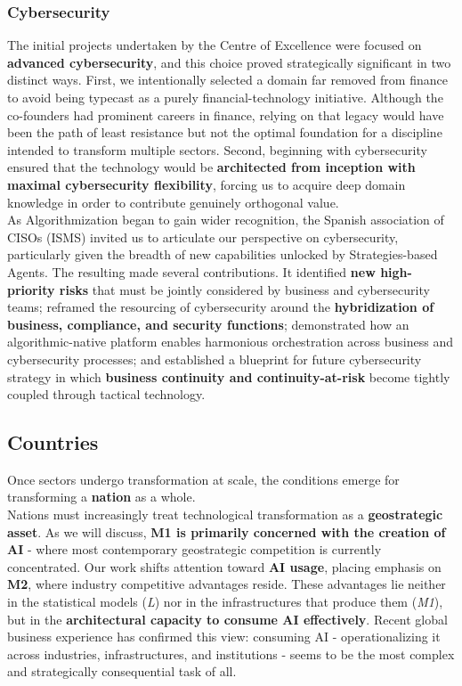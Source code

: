 \documentclass{article}
\begin{document}
\subsubsection{Cybersecurity}
\label{subsubsection: Cybersecurity}
The initial projects undertaken by the Centre of Excellence were focused on \textbf{advanced cybersecurity}, and this choice proved strategically significant in two distinct ways. First, we intentionally selected a domain far removed from finance to avoid being typecast as a purely financial-technology initiative. Although the co-founders had prominent careers in finance, relying on that legacy would have been the path of least resistance but not the optimal foundation for a discipline intended to transform multiple sectors. Second, beginning with cybersecurity ensured that the technology would be \textbf{architected from inception with maximal cybersecurity flexibility}, forcing us to acquire deep domain knowledge in order to contribute genuinely orthogonal value.\\

As Algorithmization began to gain wider recognition, the Spanish association of CISOs (ISMS) invited us to articulate our perspective on cybersecurity, particularly given the breadth of new capabilities unlocked by Strategies-based Agents. The resulting \cite{Modern Cybersecurity} made several contributions. It identified \textbf{new high-priority risks} that must be jointly considered by business and cybersecurity teams; reframed the resourcing of cybersecurity around the \textbf{hybridization of business, compliance, and security functions}; demonstrated how an algorithmic-native platform enables harmonious orchestration across business and cybersecurity processes; and established a blueprint for future cybersecurity strategy in which \textbf{business continuity and continuity-at-risk} become tightly coupled through tactical technology.\\


\subsection{Countries}
\label{subsection: Countries}
Once sectors undergo transformation at scale, the conditions emerge for transforming a \textbf{nation} as a whole.\\

Nations must increasingly treat technological transformation as a \textbf{geostrategic asset}. As we will discuss, \textbf{M1 is primarily concerned with the creation of AI} - where most contemporary geostrategic competition is currently concentrated. Our work shifts attention toward \textbf{AI usage}, placing emphasis on \textbf{M2}, where industry competitive advantages reside. These advantages lie neither in the statistical models (\textit{L}) nor in the infrastructures that produce them (\textit{M1}), but in the \textbf{architectural capacity to consume AI effectively}. Recent global business experience has confirmed this view: consuming AI - operationalizing it across industries, infrastructures, and institutions - seems to be the most complex and strategically consequential task of all.\\
\end{document}
